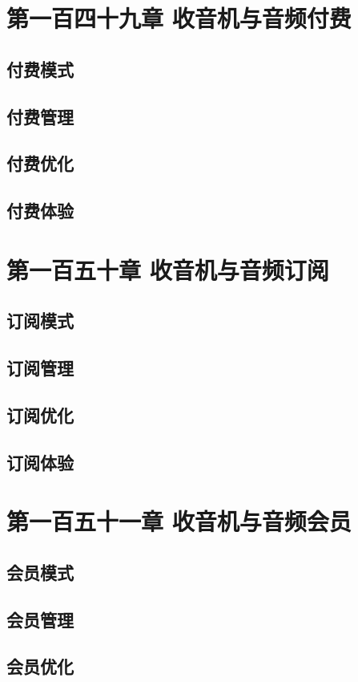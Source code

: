 \documentclass[12pt,UTF8]{ctexbook}
\begin{document}
\chapter{第一百四十九章 收音机与音频付费}

\section{付费模式}
\section{付费管理}
\section{付费优化}
\section{付费体验}

\chapter{第一百五十章 收音机与音频订阅}

\section{订阅模式}
\section{订阅管理}
\section{订阅优化}
\section{订阅体验}

\chapter{第一百五十一章 收音机与音频会员}

\section{会员模式}
\section{会员管理}
\section{会员优化}
\end{document}
